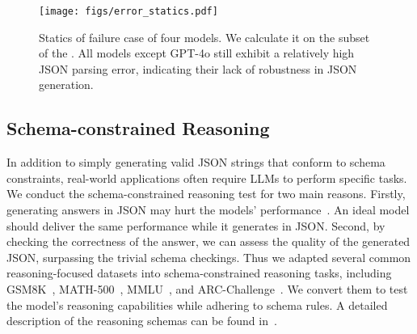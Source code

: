 
\begin{figure*}
\centering
\texttt{[image: figs/error\_statics.pdf]}
\caption{Statics of failure case of four models. We calculate it on the subset of the \ourbench. All models except GPT-4o still exhibit a relatively high JSON parsing error, indicating their lack of robustness in JSON generation.}
\label{fig:error_statics}
\end{figure*}

\subsection{Schema-constrained Reasoning}
In addition to simply generating valid JSON strings that conform to schema constraints, real-world applications often require LLMs to perform specific tasks. 
We conduct the schema-constrained reasoning test for two main reasons. 
Firstly, generating answers in JSON may hurt the models' performance~\cite{tam2024let}.
An ideal model should deliver the same performance while it generates in JSON.
Second, by checking the correctness of the answer, we can assess the quality of the generated JSON, surpassing the trivial schema checkings.
Thus we adapted several common reasoning-focused datasets into schema-constrained reasoning tasks, including GSM8K~\citep{cobbe2021training}, MATH-500~\citep{hendrycksmath2021}, MMLU~\citep{hendryckstest2021}, and ARC-Challenge~\citep{allenai:arc}. We convert them to test the model's reasoning capabilities while adhering to schema rules.
A detailed description of the reasoning schemas can be found in~.

